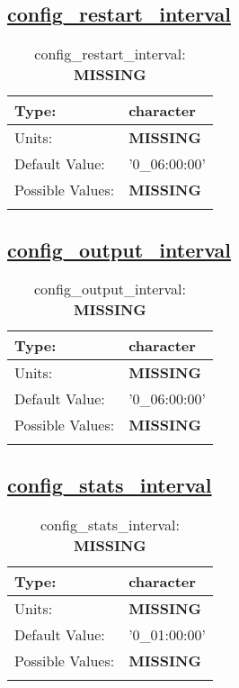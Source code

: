 \subsection[config\_restart\_interval]{\hyperref[sec:nm_tab_io]{config\_restart\_interval}}
\label{subsec:nm_sec_config_restart_interval}
\begin{center}
\begin{longtable}{| p{2.0in} | p{4.0in} |}
    \hline
    Type: & character \\
    \hline
    Units: & {\bf \color{red} MISSING} \\
    \hline
    Default Value: & '0\_06:00:00' \\
    \hline
    Possible Values: & {\bf \color{red} MISSING} \\
    \hline
    \caption{config\_restart\_interval: {\bf \color{red} MISSING}}
\end{longtable}
\end{center}
\subsection[config\_output\_interval]{\hyperref[sec:nm_tab_io]{config\_output\_interval}}
\label{subsec:nm_sec_config_output_interval}
\begin{center}
\begin{longtable}{| p{2.0in} | p{4.0in} |}
    \hline
    Type: & character \\
    \hline
    Units: & {\bf \color{red} MISSING} \\
    \hline
    Default Value: & '0\_06:00:00' \\
    \hline
    Possible Values: & {\bf \color{red} MISSING} \\
    \hline
    \caption{config\_output\_interval: {\bf \color{red} MISSING}}
\end{longtable}
\end{center}
\subsection[config\_stats\_interval]{\hyperref[sec:nm_tab_io]{config\_stats\_interval}}
\label{subsec:nm_sec_config_stats_interval}
\begin{center}
\begin{longtable}{| p{2.0in} | p{4.0in} |}
    \hline
    Type: & character \\
    \hline
    Units: & {\bf \color{red} MISSING} \\
    \hline
    Default Value: & '0\_01:00:00' \\
    \hline
    Possible Values: & {\bf \color{red} MISSING} \\
    \hline
    \caption{config\_stats\_interval: {\bf \color{red} MISSING}}
\end{longtable}
\end{center}
